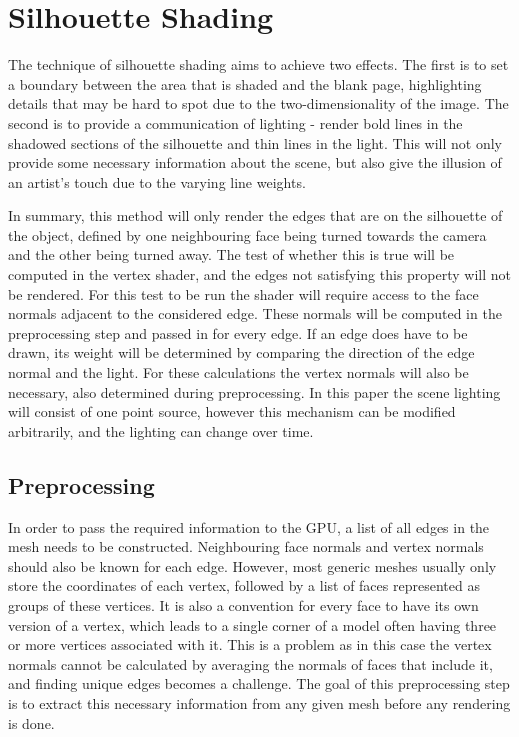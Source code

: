 \documentclass[a4paper, 12pt]{article}
\begin{document}
\section{Silhouette Shading}

The technique of silhouette shading aims to achieve two effects. The first is to set a boundary between the area that is shaded and the blank page, highlighting details that may be hard to spot due to the two-dimensionality of the image. The second is to provide a communication of lighting - render bold lines in the shadowed sections of the silhouette and thin lines in the light. This will not only provide some necessary information about the scene, but also give the illusion of an artist's touch due to the varying line weights.

In summary, this method will only render the edges that are on the silhouette of the object, defined by one neighbouring face being turned towards the camera and the other being turned away. The test of whether this is true will be computed in the vertex shader, and the edges not satisfying this property will not be rendered. For this test to be run the shader will require access to the face normals adjacent to the considered edge. These normals will be computed in the preprocessing step and passed in for every edge. If an edge does have to be drawn, its weight will be determined by comparing the direction of the edge normal and the light. For these calculations the vertex normals will also be necessary, also determined during preprocessing. In this paper the scene lighting will consist of one point source, however this mechanism can be modified arbitrarily, and the lighting can change over time.

\subsection{Preprocessing}
In order to pass the required information to the GPU, a list of all edges in the mesh needs to be constructed. Neighbouring face normals and vertex normals should also be known for each edge. However, most generic meshes usually only store the coordinates of each vertex, followed by a list of faces represented as groups of these vertices. It is also a convention for every face to have its own version of a vertex, which leads to a single corner of a model often having three or more vertices associated with it. This is a problem as in this case the vertex normals cannot be calculated by averaging the normals of faces that include it, and finding unique edges becomes a challenge. The goal of this preprocessing step is to extract this necessary information from any given mesh before any rendering is done.
\end{document}
